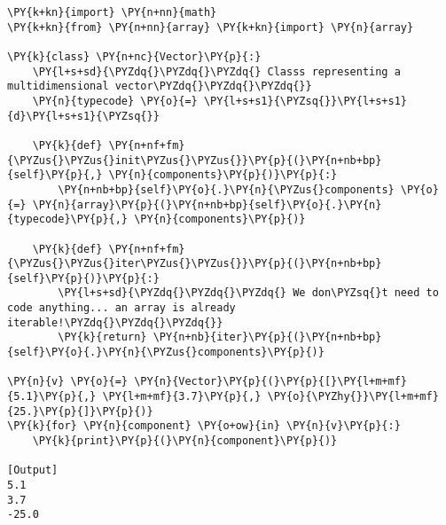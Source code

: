 \begin{Verbatim}[label=\makebox{\url{https://github.com/lucabaldini/cmepda/tree/master/slides/latex/snippets/vector\_iterable.py}},commandchars=\\\{\}]
\PY{k+kn}{import} \PY{n+nn}{math}
\PY{k+kn}{from} \PY{n+nn}{array} \PY{k+kn}{import} \PY{n}{array}

\PY{k}{class} \PY{n+nc}{Vector}\PY{p}{:}
    \PY{l+s+sd}{\PYZdq{}\PYZdq{}\PYZdq{} Classs representing a multidimensional vector\PYZdq{}\PYZdq{}\PYZdq{}}    
    \PY{n}{typecode} \PY{o}{=} \PY{l+s+s1}{\PYZsq{}}\PY{l+s+s1}{d}\PY{l+s+s1}{\PYZsq{}}
    
    \PY{k}{def} \PY{n+nf+fm}{\PYZus{}\PYZus{}init\PYZus{}\PYZus{}}\PY{p}{(}\PY{n+nb+bp}{self}\PY{p}{,} \PY{n}{components}\PY{p}{)}\PY{p}{:}
        \PY{n+nb+bp}{self}\PY{o}{.}\PY{n}{\PYZus{}components} \PY{o}{=} \PY{n}{array}\PY{p}{(}\PY{n+nb+bp}{self}\PY{o}{.}\PY{n}{typecode}\PY{p}{,} \PY{n}{components}\PY{p}{)}
        
    \PY{k}{def} \PY{n+nf+fm}{\PYZus{}\PYZus{}iter\PYZus{}\PYZus{}}\PY{p}{(}\PY{n+nb+bp}{self}\PY{p}{)}\PY{p}{:}
        \PY{l+s+sd}{\PYZdq{}\PYZdq{}\PYZdq{} We don\PYZsq{}t need to code anything... an array is already iterable!\PYZdq{}\PYZdq{}\PYZdq{}}
        \PY{k}{return} \PY{n+nb}{iter}\PY{p}{(}\PY{n+nb+bp}{self}\PY{o}{.}\PY{n}{\PYZus{}components}\PY{p}{)}
    
\PY{n}{v} \PY{o}{=} \PY{n}{Vector}\PY{p}{(}\PY{p}{[}\PY{l+m+mf}{5.1}\PY{p}{,} \PY{l+m+mf}{3.7}\PY{p}{,} \PY{o}{\PYZhy{}}\PY{l+m+mf}{25.}\PY{p}{]}\PY{p}{)}
\PY{k}{for} \PY{n}{component} \PY{o+ow}{in} \PY{n}{v}\PY{p}{:}
    \PY{k}{print}\PY{p}{(}\PY{n}{component}\PY{p}{)}

[Output]
5.1
3.7
-25.0
\end{Verbatim}